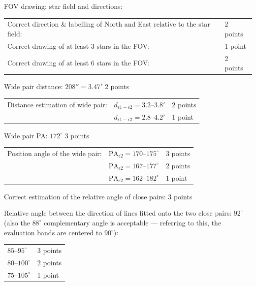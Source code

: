 FOV drawing: star field and directions:
\begin{center}
\begin{tabular}{ll}
Correct direction \& labelling of North and East relative to the star field: & 2 points \\
Correct drawing of at least 3 stars in the FOV: & 1 point \\
Correct drawing of at least 6 stars in the FOV: & 2 points \\
\end{tabular}
\end{center}

Wide pair distance: $208'' = 3.47'$ \hfill 2 points

\begin{center}
\begin{tabular}{lll}
Distance estimation of wide pair: & $d_{\epsilon 1 - \epsilon 2} = 3.2$--$3.8'$ & 2 points \\
 & $d_{\epsilon 1 - \epsilon 2} = 2.8$--$4.2'$ & 1 point \\
\end{tabular}
\end{center}

Wide pair PA: $172^\circ$ \hfill 3 points

\begin{center}
\begin{tabular}{lll}
Position angle of the wide pair: & $\mathrm{PA}_{\epsilon 2} = 170$--$175^\circ$ & 3 points \\
 & $\mathrm{PA}_{\epsilon 2} = 167$--$177^\circ$ & 2 points \\
 & $\mathrm{PA}_{\epsilon 2} = 162$--$182^\circ$ & 1 point \\
\end{tabular}
\end{center}

Correct estimation of the relative angle of close pairs: \hfill 3 points

Relative angle between the direction of lines fitted onto the two close
pairs: $92^\circ$ (also the $88^\circ$ complementary angle is acceptable ---
referring to this, the evaluation bands are centered to $90^\circ$):
\begin{center}
\begin{tabular}{ll}
$85$--$95^\circ$ & 3 points \\
$80$--$100^\circ$ & 2 points \\
$75$--$105^\circ$ & 1 point \\
\end{tabular}
\end{center}

